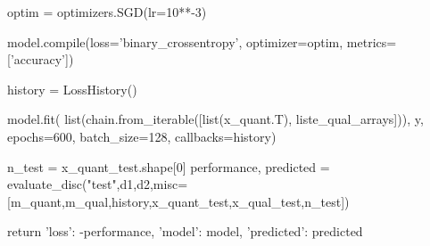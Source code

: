 \begin{pylisting}
    optim = optimizers.SGD(lr=10**-3)       
 
    model.compile(loss='binary_crossentropy', optimizer=optim, metrics=['accuracy'])

    history = LossHistory()
    
    model.fit(
      list(chain.from_iterable([list(x_quant.T), liste_qual_arrays])),
      y,
      epochs=600,
      batch_size=128,
      callbacks=history)

    n_test = x_quant_test.shape[0]
    performance, predicted = evaluate_disc("test",d1,d2,misc=[m_quant,m_qual,history,x_quant_test,x_qual_test,n_test])
  
    return {'loss': -performance, 'model': model, 'predicted': predicted}

\end{pylisting}

\printbibliography[heading=subbibliography, title=References of Appendix B]